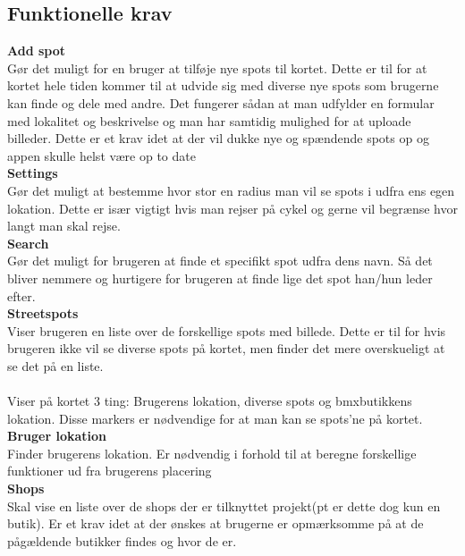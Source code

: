 \documentclass[12pt]{article}
\begin{document}
\subsection*{Funktionelle krav}
\textbf{Add spot} \\ Gør det muligt for en bruger at tilføje nye spots til kortet. Dette er til for at kortet hele tiden kommer til at udvide sig med diverse nye spots som brugerne kan finde og dele med andre. Det fungerer sådan at man udfylder en formular med lokalitet og beskrivelse og man har samtidig mulighed for at uploade billeder. Dette er et krav idet at der vil dukke nye og spændende spots op og appen skulle helst være op to date\\
\textbf{Settings}\\ Gør det muligt at bestemme hvor stor en radius man vil se spots i udfra ens egen lokation. Dette er især vigtigt hvis man rejser på cykel og gerne vil begrænse hvor langt man skal rejse.\\
\textbf{Search}\\ Gør det muligt for brugeren at finde et specifikt spot udfra dens navn. Så det bliver nemmere og hurtigere for brugeren at finde lige det spot han/hun leder efter.\\
\textbf{Streetspots}\\ Viser brugeren en liste over de forskellige spots med billede. Dette er til for hvis brugeren ikke vil se diverse spots på kortet, men finder det mere overskueligt at se det på en liste.\\
\newpage
{}\\ Viser på kortet 3 ting: Brugerens lokation, diverse spots og bmxbutikkens lokation. Disse markers er nødvendige for at man kan se spots'ne på kortet.\\
\textbf{Bruger lokation}\\ Finder brugerens lokation. Er nødvendig i forhold til at beregne forskellige funktioner ud fra brugerens placering\\
\textbf{Shops}\\ Skal vise en liste over de shops der er tilknyttet projekt(pt er dette dog kun en butik). Er et krav idet at der ønskes at brugerne er opmærksomme på at de pågældende butikker findes og hvor de er.
\end{document}
